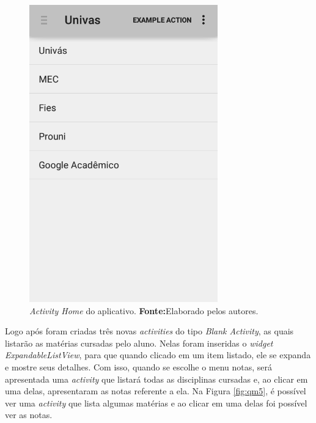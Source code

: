 	\begin{figure}[h!]
			\centerline{\includegraphics[scale=0.5]{./imagens/2_q_metodologico/qm4.png}}
			\caption[\textit{Activity Home} do aplicativo]{\textit{Activity Home} do aplicativo.
			 \textbf{Fonte:}Elaborado pelos autores.}
			\label{fig:qm4}
			
		\end{figure}
	
	\pagebreak	
	\par Logo após foram criadas três novas \textit{activities} do tipo
\textit{Blank Activity}, as quais listarão as matérias cursadas pelo aluno.
Nelas foram inseridas o \textit{widget ExpandableListView}, para que quando
clicado em um item listado, ele se expanda e mostre seus detalhes. Com isso, quando
se escolhe o menu notas, será apresentada uma \textit{activity} que listará
todas as disciplinas cursadas e, ao clicar em uma delas, apresentaram as notas
referente a ela. Na Figura \ref{fig:qm5}, é possível ver uma
\textit{activity} que lista algumas matérias e ao clicar em uma delas foi
possível ver as notas.
	
